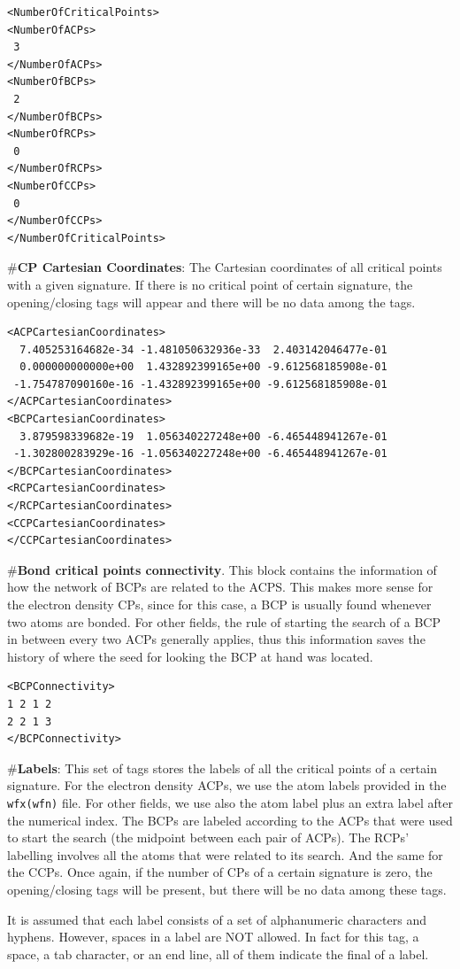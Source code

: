 \begin{verbatim}
<NumberOfCriticalPoints>
<NumberOfACPs>
 3
</NumberOfACPs>
<NumberOfBCPs>
 2
</NumberOfBCPs>
<NumberOfRCPs>
 0
</NumberOfRCPs>
<NumberOfCCPs>
 0
</NumberOfCCPs>
</NumberOfCriticalPoints>
\end{verbatim}
\#\textbf{CP Cartesian Coordinates}: The Cartesian coordinates of all critical points with a given signature. If there is no critical point of certain signature, the opening/closing tags will appear and there will be no data among the tags.
\begin{verbatim}
<ACPCartesianCoordinates>
  7.405253164682e-34 -1.481050632936e-33  2.403142046477e-01
  0.000000000000e+00  1.432892399165e+00 -9.612568185908e-01
 -1.754787090160e-16 -1.432892399165e+00 -9.612568185908e-01
</ACPCartesianCoordinates>
<BCPCartesianCoordinates>
  3.879598339682e-19  1.056340227248e+00 -6.465448941267e-01
 -1.302800283929e-16 -1.056340227248e+00 -6.465448941267e-01
</BCPCartesianCoordinates>
<RCPCartesianCoordinates>
</RCPCartesianCoordinates>
<CCPCartesianCoordinates>
</CCPCartesianCoordinates>
\end{verbatim}
\#\textbf{Bond critical points connectivity}. This block contains the information of how the network of BCPs are related to the ACPS. This makes more sense for the electron density CPs, since for this case, a BCP is usually found whenever two atoms are bonded. For other fields, the rule of starting the search of a BCP in between every two ACPs generally applies, thus this information saves the history of where the seed for looking the BCP at hand was located.
\begin{verbatim}
<BCPConnectivity>
1 2 1 2
2 2 1 3
</BCPConnectivity>
\end{verbatim}
\#\textbf{Labels}: This set of tags stores the labels of all the critical points of a certain signature. For the electron density ACPs, we use the atom labels provided in the \texttt{wfx(wfn)} file. For other fields, we use also the atom label plus an extra label after the numerical index. The BCPs are labeled according to the ACPs that were used to start the search (the midpoint between each pair of ACPs). The RCPs' labelling involves all the atoms that were related to its search. And the same for the CCPs. Once again, if the number of CPs of a certain signature is zero, the opening/closing tags will be present, but there will be no data among these tags.

It is assumed that each label consists of a set of alphanumeric characters and hyphens. However, spaces in a label are NOT allowed. In fact for this tag, a space, a tab character, or an end line, all of them indicate the final of a label.


